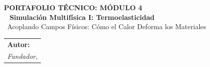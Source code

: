 \documentclass[11pt, a4paper]{article}
\newcommand{\moduleNumber}{4}
\newcommand{\moduleTitle}{Simulación Multifísica I: Termoelasticidad}
\newcommand{\moduleSubtitle}{Acoplando Campos Físicos: Cómo el Calor Deforma los Materiales}
\newcommand{\partAfile}{M4_Parte_A.tex}
\newcommand{\partBfile}{M4_Parte_B.tex}
\newcommand{\bibfile}{referencias_mod4}
\begin{document}
\sffamily
{\color{WasaffCopper} \large \textbf{PORTAFOLIO TÉCNICO: MÓDULO \moduleNumber}}\\
\
{\color{WasaffNavy} \huge \textbf{\moduleTitle}}\\
\
{\Large \moduleSubtitle}\\
\vspace{1cm}
\rmfamily
\begin{tabular}{@{}p{14cm}}
    \textbf{Autor:} \consultingAuthor \\
    \textit{Fundador, \consultingCompany} \\
\end{tabular}
\
\hrulefill
\
\tableofcontents
\
\hrulefill
\
\newpage


\clearpage 


\newpage


\end{document}
